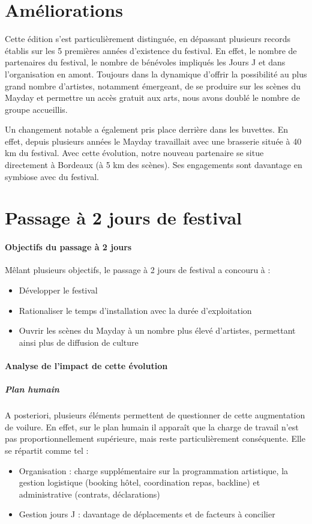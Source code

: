 \documentclass[12pt,a4paper]{report}
\begin{document}
\section{Améliorations}
Cette édition s'est particulièrement distinguée, en dépassant plusieurs records établis sur les 5 premières années d'existence du festival. En effet, le nombre de partenaires du festival, le nombre de bénévoles impliqués les Jours J et dans l'organisation en amont. Toujours dans la dynamique d'offrir la possibilité au plus grand nombre d'artistes, notamment émergeant, de se produire sur les scènes du Mayday et permettre un accès gratuit aux arts, nous avons doublé le nombre de groupe accueillis.

Un changement notable a également pris place derrière dans les buvettes. En effet, depuis plusieurs années le Mayday travaillait avec une brasserie située à 40 km du festival. Avec cette évolution, notre nouveau partenaire se situe directement à Bordeaux (à 5 km des scènes). Ses engagements sont davantage en symbiose avec du festival.

\section{Passage à 2 jours de festival}

\paragraph{Objectifs du passage à 2 jours}
Mêlant plusieurs objectifs, le passage à 2 jours de festival a concouru à : 
\begin{itemize}
\item Développer le festival
\item Rationaliser le temps d'installation avec la durée d'exploitation
\item Ouvrir les scènes du Mayday à un nombre plus élevé d'artistes, permettant ainsi plus de diffusion de culture
\end{itemize}

\paragraph{Analyse de l'impact de cette évolution}
\subparagraph{Plan humain}
A posteriori, plusieurs éléments permettent de questionner de cette augmentation de voilure. En effet, sur le plan humain il apparaît que la charge de travail n'est pas proportionnellement supérieure, mais reste particulièrement conséquente. Elle se répartit comme tel : 
\begin{itemize}
\item Organisation : charge supplémentaire sur la programmation artistique, la gestion logistique (booking hôtel, coordination repas, backline) et administrative (contrats, déclarations)
\item Gestion jours J : davantage de déplacements et de facteurs à concilier
\end{itemize}
\end{document}
